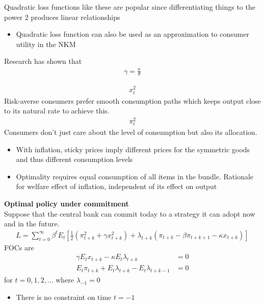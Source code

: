 \documentclass{beamer}
\begin{document}
\begin{frame}
Quadratic loss functions like these are popular since differentiating things to the power 2 produces linear relationships
 \begin{itemize}
   \item Quadratic loss function can also be used as an approximation to consumer utility in the NKM
 \end{itemize}
 Research has shown that 
 \begin{align}
   \gamma=\frac{\kappa}{\theta}   
 \end{align}
\end{frame}




\begin{frame}
  \begin{align}
    x_t^2 
  \end{align}
  Risk-averse consumers prefer smooth consumption paths which keeps output close to its natural rate to achieve this.
  \begin{align}
    \pi_t^2
  \end{align}
  Consumers don't just care about the level of consumption but also its allocation. 
  \begin{itemize}
    \item With inflation, sticky prices imply different prices for the symmetric goods and thus different consumption levels
    \item Optimality requires equal consumption of all items in the bundle. Rationale for welfare effect of inflation, independent of its effect on output
  \end{itemize}
\end{frame}

\begin{frame}
  \textbf{Optimal policy under commitment}\\
  Suppose that the central bank can commit today to a strategy it can adopt now and in the future. 
\begin{align}
  L= \sum_{t=0}^{\infty} \beta^tE_t \left[ \frac{1}{2}  (\pi_{t+k}^2 + \gamma x_{t+k}^2) + 
  \lambda_{t+k} (\pi_{t+k} - \beta \pi_{t+k+1} - \kappa x_{t+k}) \right] 
\end{align}
FOCs are 
\begin{align}
  \gamma E_t x_{t+k} - \kappa E_t \lambda_{t+k} &= 0\\
  E_t\pi_{t+k} + E_t\lambda_{t+k} - E_t \lambda_{t+k-1} &=0
\end{align}
for $t=0,1,2,...$ where $\lambda_{-1}=0$
\begin{itemize}
  \item There is no constraint on time $t=-1$
\end{itemize}
\end{frame}
\end{document}
